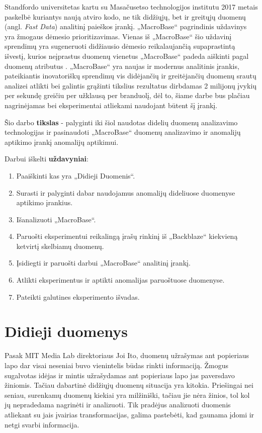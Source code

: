 \documentclass{VUMIFPSkursinis}
\begin{document}
Standfordo universitetas kartu su Masačusetso technologijos institutu 2017 metais paskelbė kuriantys naują atviro kodo, ne tik didžiųjų, bet ir greitųjų duomenų (angl. \textit{Fast Data}) analitinį paieškos įrankį. „MacroBase“ pagrindinis uždavinys yra žmogaus dėmesio prioritizavimas. Vienas iš „MacroBase“ šio uždavinį sprendimų yra sugeneruoti didžiausio dėmesio reikalaujančią supaprastintą išvestį, kurios neįprastus duomenų vienetus „MacroBase“ padeda aiškinti pagal duomenų atributus \cite{macrobase_overview, prioritizing_attention}. „MacroBase“ yra naujas ir modernus analitinis įrankis, pateikiantis inovatoriškų sprendimų vis didėjančių ir greitėjančių duomenų srautų analizei atlikti bei galintis grąžinti tikslius rezultatus dirbdamas 2 milijonų įvykių per sekundę greičiu per užklausą per branduolį, dėl to, šiame darbe bus plačiau nagrinėjamas bei eksperimentai atliekami naudojant būtent šį įrankį.

Šio darbo \textbf{tikslas} - palyginti iki šiol naudotas didelių duomenų analizavimo technologijas ir pasinaudoti „MacroBase“ duomenų analizavimo ir anomalijų aptikimo įrankį anomalijų aptikimui.\par

Darbui iškelti \textbf{uždavyniai}:\par

\begin{enumerate}
\item Paaiškinti kas yra „Didieji Duomenis“.
\item Surasti ir palyginti dabar naudojamus anomalijų dideliuose duomenyse aptikimo įrankius.
\item Išanalizuoti „MacroBase“.
\item Paruošti eksperimentui reikalingą įrašų rinkinį iš „Backblaze“ kiekvieną ketvirtį skelbiamų duomenų.
\item Įsidiegti ir paruošti darbui „MacroBase“ analitinį įrankį.
\item Atlikti eksperimentus ir aptikti anomalijas paruoštuose duomenyse.
\item Pateikti galutines eksperimento išvadas.
\end{enumerate}

\section{Didieji duomenys}
Pasak MIT Media Lab direktoriaus Joi Ito, duomenų užrašymas ant popieriaus lapo dar visai neseniai buvo vienintelis būdas rinkti informaciją. Žmogus sugalvotas idėjas ir mintis užrašydamas ant popieriaus lapo jas paversdavo žiniomis. Tačiau dabartinė didžiųjų duomenų situacija yra kitokia. Priešingai nei seniau, surenkamų duomenų kiekiai yra milžiniški, tačiau jie nėra žinios, tol kol jų nepradedama nagrinėti ir analizuoti. Tik pradėjus analizuoti duomenis atliekant su jais įvairias transformacijas, galima pastebėti, kad gaunama įdomi ir netgi svarbi informacija\cite{documentary}. \par
\end{document}
